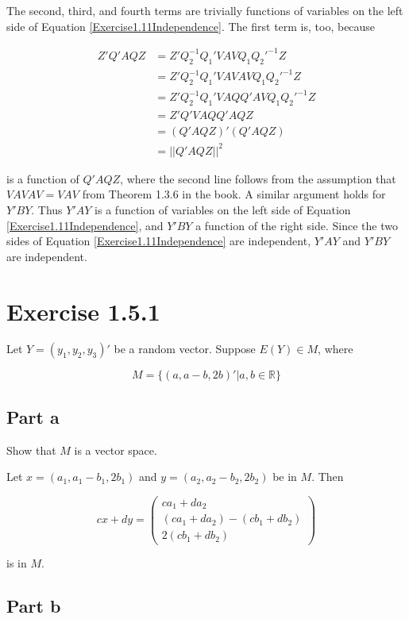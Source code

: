 \documentclass{article}
\newcommand{\R}{\mathbb{R}}
\begin{document}
The second, third, and fourth terms are trivially functions of variables on the left side of Equation \ref{Exercise1.11Independence}. The first term is, too, because

\begin{align*}
Z'Q'AQZ &= Z'Q_2^{-1}Q_1'VAVQ_1Q_2'^{-1}Z \\
&= Z'Q_2^{-1}Q_1'VAVAVQ_1Q_2'^{-1}Z \\
&= Z'Q_2^{-1}Q_1'VAQQ'AVQ_1Q_2'^{-1}Z \\
&= Z'Q'VAQQ'AQZ \\
&= (Q'AQZ)'(Q'AQZ) \\
&= ||Q'AQZ||^2
\end{align*}

is a function of $Q'AQZ$, where the second line follows from the assumption that $VAVAV=VAV$ from Theorem 1.3.6 in the book. A similar argument holds for $Y'BY$. Thus $Y'AY$ is a function of variables on the left side of Equation \ref{Exercise1.11Independence}, and $Y'BY$ a function of the right side. Since the two sides of Equation \ref{Exercise1.11Independence} are independent, $Y'AY$ and $Y'BY$ are independent.

\section*{Exercise 1.5.1}

Let $Y = (y_1, y_2, y_3)'$ be a random vector. Suppose $E(Y) \in M$, where

\[
M = \{
(a, a-b, 2b)'|a, b \in \R
\}
\]

\subsection*{Part a}

Show that $M$ is a vector space.

Let $x = (a_1, a_1-b_1, 2b_1)$ and $y = (a_2, a_2-b_2, 2b_2)$ be in $M$. Then

\[
cx+dy = \begin{pmatrix}
ca_1+da_2 \\
(ca_1+da_2) - (cb_1+db_2) \\
2(cb_1+db_2)
\end{pmatrix}
\]

is in $M$.

\subsection*{Part b}
\end{document}
